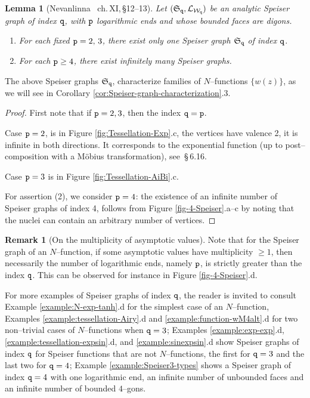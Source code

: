 \documentclass[final,3p,times]{elsarticle}
\newtheorem{lemma}[theorem]{Lemma}
\theoremstyle{definition}
\newtheorem{remark}[theorem]{Remark}
\begin{document}
\begin{lemma}[Nevanlinna \cite{Nevanlinna2}\, ch.\,XI,\,\S12--13]
\label{lemma-q-2-3}
Let $(\mathfrak{S}_{\tt q}, \mathcal{L}_{\mathcal{W}_{\tt q}} )$ be an
analytic Speiser graph 
of index $\tt q$, with $\tt p$ logarithmic ends and whose bounded 
faces are digons.

\begin{enumerate}[label=\arabic*),leftmargin=*]
\item
For each fixed ${\tt p}=2,\, 3$, 
there exist only one Speiser graph $\mathfrak{S}_{\tt q}$ of index $\tt q$.

\item 
For each ${\tt p} \geq 4$, 
there exist infinitely many Speiser graphs.
\end{enumerate}
\end{lemma}


\noindent 
The above Speiser graphs $\mathfrak{S}_{\tt q}$,
characterize families of $N$--functions $\{w(z)\}$, as we will see
in Corollary  \ref{cor:Speiser-graph-characterization}.3.


\begin{proof}
First note that if ${\tt p}=2,3$, then the index ${\tt q} = {\tt p}$.

Case ${\tt p}=2$, 
is in Figure \ref{fig:Tessellation-Exp}.c,
the vertices have valence 2, it is infinite in both 
directions. 
It corresponds to the exponential function (up to post--composition
with a M\"obius transformation), see \cite{Nevanlinna-Paatero}\,\S\,6.16.  

Case ${\tt p}=3$ is in Figure  
\ref{fig:Tessellation-AiBi}.c.


For assertion (2), we consider ${\tt p} = 4$:
the existence of an infinite number of Speiser graphs of index 4,
follows from Figure \ref{fig-4-Speiser}.a--c
by noting that the nuclei can contain an arbitrary number of vertices.
\end{proof}


\begin{remark}[On the multiplicity of asymptotic values]
Note that for the Speiser graph of an $N$--function, 
if some asymptotic values have multiplicity $\geq 1$, then necessarily the number of 
logarithmic ends, namely $\tt p$, is strictly greater than the index $\tt q$. 
This can be observed for instance in Figure \ref{fig-4-Speiser}.d.
\end{remark}



For more examples of Speiser graphs of index $\tt q$, the reader is invited to
consult Example \ref{example:N-exp-tanh}.d for the simplest case of an $N$--function, 
Examples \ref{example:tessellation-Airy}.d and \ref{example:function-wM4alt}.d 
for two non--trivial cases of $N$--functions when ${\tt q} = 3$;
Examples \ref{example:exp-exp}.d, \ref{example:tessellation-expsin}.d, 
and \ref{example:sinexpsin}.d show Speiser graphs of index $\tt q$
for Speiser functions that are not $N$--functions, 
the first for ${\tt q}=3$ and the last two for ${\tt q}=4$;
Example \ref{example:Speiser3-types} shows a Speiser graph of index ${\tt q}=4$ with
one logarithmic end, an infinite number of unbounded faces and 
an infinite number of bounded $4$--gons.
\end{document}
